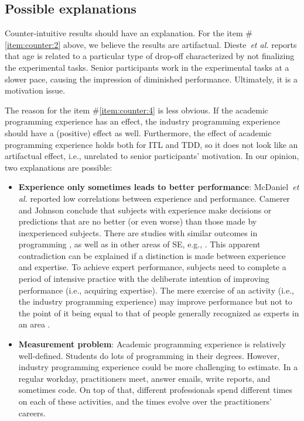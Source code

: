 \documentclass[10pt,conference]{IEEEtran}\usepackage[]{graphicx}\usepackage[table,xcdraw]{xcolor}
\newcommand{\etal}[0]{~\textit{et al.}}
\begin{document}
\subsection{Possible explanations}

Counter-intuitive results should have an explanation. For the item \#\ref{item:counter:2} above, we believe the results are artifactual. Dieste\etal \cite{dieste2017professionals} reports that age is related to a particular type of drop-off characterized by not finalizing the experimental tasks. Senior participants work in the experimental tasks at a slower pace, causing the impression of diminished performance. Ultimately, it is a motivation issue.

The reason for the item \#\ref{item:counter:4} is less obvious. If the academic programming experience has an effect, the industry programming experience should have a (positive) effect as well. Furthermore, the effect of academic programming experience holds both for ITL and TDD, so it does not look like an artifactual effect, i.e., unrelated to senior participants' motivation. In our opinion, two explanations are possible:
\begin{itemize}
     \item \textbf{Experience only sometimes leads to better performance}: McDaniel\etal \cite{mcdaniel1988job} reported low correlations between experience and performance. Camerer and Johnson \cite{camerer1991process} conclude that subjects with experience make decisions or predictions that are no better (or even worse) than those made by inexperienced subjects. There are studies with similar outcomes in programming \cite{muller2004empirical,sheppard1979modern}, as well as in other areas of SE, e.g., \cite{marakas1998semantic,sonnentag1995excellent}. 
     This apparent contradiction can be explained if a distinction is made between experience and expertise. To achieve expert performance, subjects need to complete a period of intensive practice with the deliberate intention of improving performance (i.e., acquiring expertise). The mere exercise of an activity (i.e., the industry programming experience) may improve performance but not to the point of it being equal to that of people generally recognized as experts in an area \cite{ericsson1994expert}.
     \item \textbf{Measurement problem}: Academic programming experience is relatively well-defined. Students do lots of programming in their degrees. However, industry programming experience could be more challenging to estimate. In a regular workday, practitioners meet, answer emails, write reports, and sometimes code. On top of that, different professionals spend different times on each of these activities, and the times evolve over the practitioners' careers.
\end{itemize}
\end{document}
